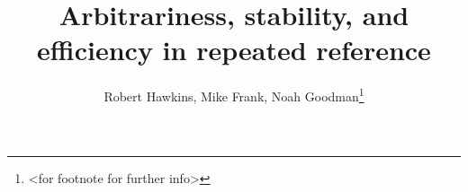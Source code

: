 \documentclass[manuscript]{stjour}
\begin{document}
\title{Arbitrariness, stability, and efficiency in repeated reference}



\author[Author Names]
{Robert Hawkins, Mike Frank, Noah Goodman\thanks{<for footnote for further info>}}










\end{document}
